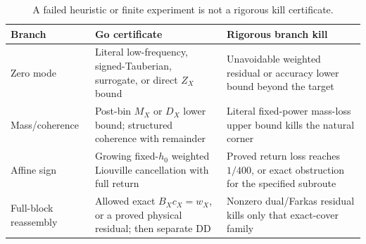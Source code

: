 \begin{table}[H]
\centering
\small
\begin{tabularx}{\textwidth}{@{}
  >{\raggedright\arraybackslash}p{}
  >{\raggedright\arraybackslash}X
  >{\raggedright\arraybackslash}X@{}}
\toprule
Branch & Go certificate & Rigorous branch kill\\
\midrule
Zero mode
&
Literal low-frequency, signed-Tauberian, surrogate, or direct
\(Z_X\) bound
&
Unavoidable weighted residual or accuracy lower bound beyond the
target
\\
\addlinespace
Mass/coherence
&
Post-bin \(M_X\) or \(D_X\) lower bound; structured coherence with
remainder
&
Literal fixed-power mass-loss upper bound kills the natural corner
\\
\addlinespace
Affine sign
&
Growing fixed-\(h_0\) weighted Liouville cancellation with full return
&
Proved return loss reaches \(1/400\), or exact obstruction for the
specified subroute
\\
\addlinespace
Full-block reassembly
&
Allowed exact \(B_Xc_X=w_X\), or a proved physical residual; then
separate DD
&
Nonzero dual/Farkas residual kills only that exact-cover family
\\
\bottomrule
\end{tabularx}
\caption{A failed heuristic or finite experiment is not a rigorous
kill certificate.}
\label{tab:stop-go-summary}
\end{table}
